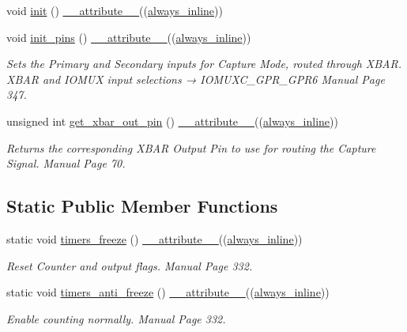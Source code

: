 \begin{DoxyCompactItemize}
void \hyperlink{classTMR1Controller_af92315e340766e3857eb6a20e7cab673}{init} () \hyperlink{utilities_8hpp_a103d5b3998e0dd804213c8f30a094f4d}{\+\_\+\+\_\+attribute\+\_\+\+\_\+}((\hyperlink{classTMR1Controller_adce8e8a496510485a88ccc5b88595672}{always\+\_\+inline}))
\item 
void \hyperlink{classTMR1Controller_a1c5d358760aa98641333f63c7bcacd3a}{init\+\_\+pins} () \hyperlink{utilities_8hpp_a103d5b3998e0dd804213c8f30a094f4d}{\+\_\+\+\_\+attribute\+\_\+\+\_\+}((\hyperlink{classTMR1Controller_adce8e8a496510485a88ccc5b88595672}{always\+\_\+inline}))
\begin{DoxyCompactList}\small\item\em Sets the Primary and Secondary inputs for Capture Mode, routed through X\+B\+AR.  X\+B\+AR and I\+O\+M\+UX input selections → I\+O\+M\+U\+X\+C\+\_\+\+G\+P\+R\+\_\+\+G\+P\+R6 Manual Page 347. \end{DoxyCompactList}\item 
unsigned int \hyperlink{classTMR1Controller_a5b2f74d17a84db6a9c2957b75d79ab98}{get\+\_\+xbar\+\_\+out\+\_\+pin} () \hyperlink{utilities_8hpp_a103d5b3998e0dd804213c8f30a094f4d}{\+\_\+\+\_\+attribute\+\_\+\+\_\+}((\hyperlink{classTMR1Controller_adce8e8a496510485a88ccc5b88595672}{always\+\_\+inline}))
\begin{DoxyCompactList}\small\item\em Returns the corresponding X\+B\+AR Output Pin to use for routing the Capture Signal.  Manual Page 70. \end{DoxyCompactList}\end{DoxyCompactItemize}
\subsection*{Static Public Member Functions}
\begin{DoxyCompactItemize}
\item 
static void \hyperlink{classTMR1Controller_aa00df5e2d591a36b1049275c9a293c51}{timers\+\_\+freeze} () \hyperlink{utilities_8hpp_a103d5b3998e0dd804213c8f30a094f4d}{\+\_\+\+\_\+attribute\+\_\+\+\_\+}((\hyperlink{classTMR1Controller_adce8e8a496510485a88ccc5b88595672}{always\+\_\+inline}))
\begin{DoxyCompactList}\small\item\em Reset Counter and output flags.  Manual Page 332. \end{DoxyCompactList}\item 
static void \hyperlink{classTMR1Controller_acb383aa5321f552f018e4e217e2211f4}{timers\+\_\+anti\+\_\+freeze} () \hyperlink{utilities_8hpp_a103d5b3998e0dd804213c8f30a094f4d}{\+\_\+\+\_\+attribute\+\_\+\+\_\+}((\hyperlink{classTMR1Controller_adce8e8a496510485a88ccc5b88595672}{always\+\_\+inline}))
\begin{DoxyCompactList}\small\item\em Enable counting normally.  Manual Page 332. \end{DoxyCompactList}\end{DoxyCompactItemize}
